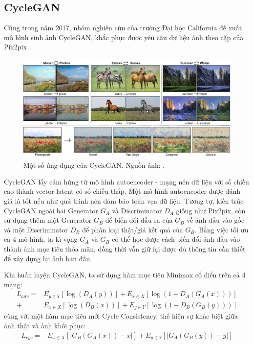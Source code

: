 \documentclass[12pt]{extreport}
\begin{document}
\subsection{CycleGAN}

Cũng trong năm 2017, nhóm nghiên cứu của trường Đại học California đề xuất mô hình sinh ảnh CycleGAN, khắc phục được yêu cầu dữ liệu ảnh theo cặp của Pix2pix \cite{CycleGAN2017}.

\begin{figure}[H]
    \centering
    \includegraphics[width=\textwidth]{figure15}
    \caption{Một số ứng dụng của CycleGAN. Nguồn ảnh: \cite{CycleGAN2017}.}
\end{figure}

CycleGAN lấy cảm hứng từ mô hình autoencoder - mạng nén dữ liệu với số chiều cao thành vector latent có số chiều thấp. Một mô hình autoencoder được đánh giá là tốt nếu như quá trình nén đảm bảo toàn vẹn dữ liệu. Tương tự, kiến trúc CycleGAN ngoài hai Generator $ G_A $ và Discriminator $ D_A $ giống như Pix2pix, còn sử dụng thêm một Generator $ G_B $ để biến đổi đầu ra của $ G_B $ về ảnh đầu vào gốc và một Discriminator $ D_B $ để phân loại thật/giả kết quả của $ G_B $. Bằng việc tối ưu cả 4 mô hình, ta kì vọng $ G_A $ và $ G_B $ có thể học được cách biến đổi ảnh đầu vào thành ảnh mục tiêu thỏa mãn, đồng thời vẫn giữ lại được đủ thông tin cần thiết để xây dựng lại ảnh ban đầu.

Khi huấn luyện CycleGAN, ta sử dụng hàm mục tiêu Minimax cổ điển trên cả 4 mạng:
\begin{align*}
    L_{adv} = & E_{y \in Y} [\log(D_A(y))] + E_{x \in X} [\log(1 - D_A(G_A(x)))] \\
    +         & E_{x \in X} [\log(D_B(x))] + E_{y \in Y} [\log(1 - D_B(G_B(y)))]
\end{align*}
cùng với một hàm mục tiêu mới Cycle Consistency, thể hiện sự khác biệt giữa ảnh thật và ảnh khôi phục:
\begin{align*}
    L_{cyc} = & E_{x \in X} [|G_B(G_A(x)) - x|] + E_{y \in Y} [|G_A(G_B(y)) - y|]
\end{align*}
\end{document}
